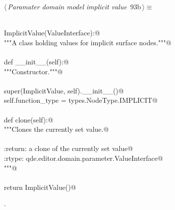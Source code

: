 \documentclass[
    a4paper,      %
    10pt,         %
    openright,    %
    notitlepage,  %
    parskip=half, %
]{scrreprt}       %
\theoremstyle{definition}                    %
\begin{document}
\begin{flushleft} \small
\begin{minipage}{\linewidth}\label{scrap153}\raggedright\small
{} $\langle\,${\itshape Paramater domain model implicit value}\nobreak\ {\footnotesize {93b}}$\,\rangle\equiv$
\vspace{-1exm}
\begin{list}{}{} \item
\mbox{}\lstinline@@\\
\mbox{}\lstinline@class ImplicitValue(ValueInterface):@\\
\mbox{}\lstinline@    """A class holding values for implicit surface nodes."""@\\
\mbox{}\lstinline@@\\
\mbox{}\lstinline@    def __init__(self):@\\
\mbox{}\lstinline@        """Constructor."""@\\
\mbox{}\lstinline@@\\
\mbox{}\lstinline@        super(ImplicitValue, self).__init__()@\\
\mbox{}\lstinline@        self.function_type = types.NodeType.IMPLICIT@\\
\mbox{}\lstinline@@\\
\mbox{}\lstinline@    def clone(self):@\\
\mbox{}\lstinline@        """Clones the currently set value.@\\
\mbox{}\lstinline@@\\
\mbox{}\lstinline@        :return: a clone of the currently set value@\\
\mbox{}\lstinline@        :rtype:  qde.editor.domain.parameter.ValueInterface@\\
\mbox{}\lstinline@        """@\\
\mbox{}\lstinline@@\\
\mbox{}\lstinline@        return ImplicitValue()@{\NWsep}
\end{list}
\vspace{-1.5ex}
\footnotesize
\begin{list}{}{\setlength{\itemsep}{-\parsep}\setlength{\itemindent}{-\leftmargin}}
\item {\NWtxtMacroNoRef}.

\item{}
\end{list}
\end{minipage}\vspace{4ex}
\end{flushleft}
\end{document}
